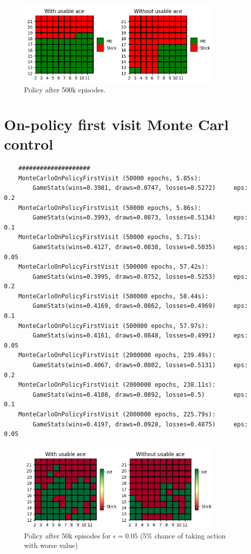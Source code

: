 \documentclass{article}
\begin{document}
\begin{figure}[h]
    \centering
    \includegraphics[width=10cm]{plots/mces_policy_500k.png}
    \caption{Policy after 500k episodes.}
\end{figure}

\newpage


\section{On-policy first visit Monte Carl control}

\begin{verbatim}
    ####################
    MonteCarloOnPolicyFirstVisit (50000 epochs, 5.85s):
        GameStats(wins=0.3981, draws=0.0747, losses=0.5272)		eps: 0.2
    MonteCarloOnPolicyFirstVisit (50000 epochs, 5.86s):
        GameStats(wins=0.3993, draws=0.0873, losses=0.5134)		eps: 0.1
    MonteCarloOnPolicyFirstVisit (50000 epochs, 5.71s):
        GameStats(wins=0.4127, draws=0.0838, losses=0.5035)		eps: 0.05
    MonteCarloOnPolicyFirstVisit (500000 epochs, 57.42s):
        GameStats(wins=0.3995, draws=0.0752, losses=0.5253)		eps: 0.2
    MonteCarloOnPolicyFirstVisit (500000 epochs, 58.44s):
        GameStats(wins=0.4169, draws=0.0862, losses=0.4969)		eps: 0.1
    MonteCarloOnPolicyFirstVisit (500000 epochs, 57.97s):
        GameStats(wins=0.4161, draws=0.0848, losses=0.4991)		eps: 0.05
    MonteCarloOnPolicyFirstVisit (2000000 epochs, 239.49s):
        GameStats(wins=0.4067, draws=0.0802, losses=0.5131)		eps: 0.2
    MonteCarloOnPolicyFirstVisit (2000000 epochs, 238.11s):
        GameStats(wins=0.4108, draws=0.0892, losses=0.5)		eps: 0.1
    MonteCarloOnPolicyFirstVisit (2000000 epochs, 225.79s):
        GameStats(wins=0.4197, draws=0.0928, losses=0.4875)		eps: 0.05
\end{verbatim}

\begin{figure}[h]
    \centering
    \includegraphics[width=10cm]{plots/mcopfv_policy_50k.png}
    \caption{Policy after 50k episodes for $\epsilon=0.05$ (5\% chance of taking action with worse value)}
\end{figure}
\end{document}
